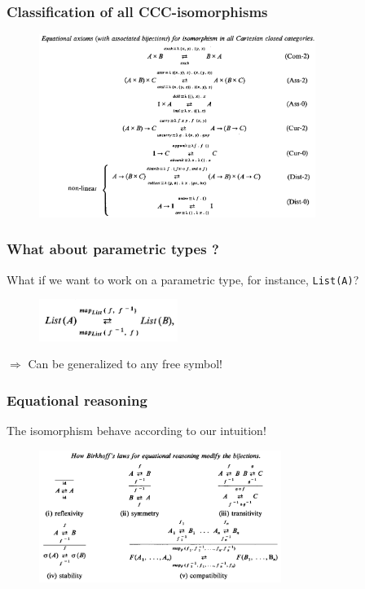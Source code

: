 \documentclass[aspectratio=169,dvipsnames,svgnames,10pt]{beamer}
\begin{document}
\begin{frame}
  \frametitle{Classification of all CCC-isomorphisms}
  
  \begin{figure}
    \centering
    \includegraphics[width=0.8\textwidth]{axiomiso}
  \end{figure}  
\end{frame}

\begin{frame}[fragile]
  \frametitle{What about parametric types ?}

  What if we want to work on a parametric type, for instance, \verb/List(A)/?

  \begin{figure}
    \centering
    \includegraphics[width=0.4\textwidth]{axiomlist}
  \end{figure}  
  
  $\Rightarrow$ Can be generalized to any free symbol!
\end{frame}

\begin{frame}
  \frametitle{Equational reasoning}

  The isomorphism behave according to our intuition!

  
  \begin{figure}
    \centering
    \includegraphics[width=0.7\textwidth]{eqreasoning}
  \end{figure}  
  
\end{frame}
\end{document}
